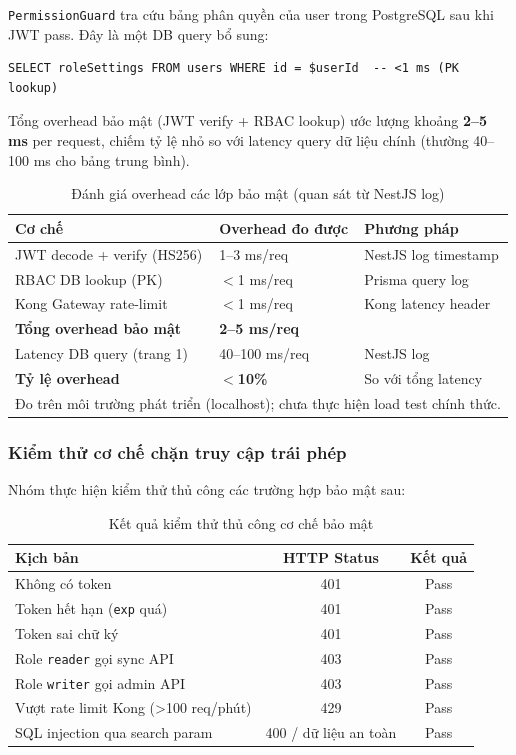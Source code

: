 \texttt{PermissionGuard} tra cứu bảng phân quyền của user trong
PostgreSQL sau khi JWT pass. Đây là một DB query bổ sung:

\begin{verbatim}
SELECT roleSettings FROM users WHERE id = $userId  -- <1 ms (PK lookup)
\end{verbatim}

Tổng overhead bảo mật (JWT verify + RBAC lookup) ước lượng khoảng
\textbf{2--5 ms} per request, chiếm tỷ lệ nhỏ so với latency
query dữ liệu chính (thường 40--100 ms cho bảng trung bình).

\begin{table}[H]
\centering
\caption{Đánh giá overhead các lớp bảo mật (quan sát từ NestJS log)}
\label{tab:security-overhead}
\begin{tabular}{lll}
\toprule
\textbf{Cơ chế} & \textbf{Overhead đo được} & \textbf{Phương pháp} \\
\midrule
JWT decode + verify (HS256) & 1--3 ms/req & NestJS log timestamp \\
RBAC DB lookup (PK)         & $<$1 ms/req & Prisma query log \\
Kong Gateway rate-limit     & $<$1 ms/req & Kong latency header \\
\midrule
\textbf{Tổng overhead bảo mật} & \textbf{2--5 ms/req} & \\
\midrule
Latency DB query (trang 1)  & 40--100 ms/req & NestJS log \\
\textbf{Tỷ lệ overhead}     & \textbf{$<$10\%} & So với tổng latency \\
\bottomrule
\multicolumn{3}{l}{\footnotesize Đo trên môi trường phát triển (localhost);
chưa thực hiện load test chính thức.}
\end{tabular}
\end{table}

\subsubsection{Kiểm thử cơ chế chặn truy cập trái phép}

Nhóm thực hiện kiểm thử thủ công các trường hợp bảo mật sau:

\begin{table}[H]
\centering
\caption{Kết quả kiểm thử thủ công cơ chế bảo mật}
\label{tab:security-test}
\begin{tabular}{p{5cm}cc}
\toprule
\textbf{Kịch bản} & \textbf{HTTP Status} & \textbf{Kết quả} \\
\midrule
Không có token                    & 401 & Pass \\
Token hết hạn (\texttt{exp} quá)  & 401 & Pass \\
Token sai chữ ký                  & 401 & Pass \\
Role \texttt{reader} gọi sync API & 403 & Pass \\
Role \texttt{writer} gọi admin API& 403 & Pass \\
Vượt rate limit Kong (>100 req/phút) & 429 & Pass \\
SQL injection qua search param   & 400 / dữ liệu an toàn & Pass \\
\bottomrule
\end{tabular}
\end{table}

